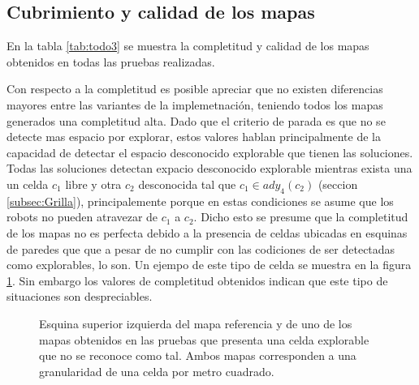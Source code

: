 \subsection{Cubrimiento y calidad de los mapas} \label{sec:exp:cubcal}



En la tabla \ref{tab:todo3} se muestra la completitud y calidad de los mapas
obtenidos en todas las pruebas realizadas. 

Con respecto a la completitud es posible apreciar que no existen diferencias
mayores entre las variantes de la implemetnación, teniendo todos los mapas
generados una completitud alta. Dado que el criterio de parada es que no se
detecte mas espacio por explorar, estos valores hablan principalmente de la
capacidad de detectar el espacio desconocido explorable que tienen las
soluciones. Todas las soluciones detectan expacio desconocido explorable
mientras exista una un celda $c_1$ libre y otra $c_2$ desconocida tal que $c_1
\in ady_4(c_2)$ (seccion \ref{subsec:Grilla}), principalemente porque en estas
condiciones se asume que los robots no pueden atravezar de $c_1$ a $c_2$. Dicho
esto se presume que la completitud de los mapas no es perfecta debido a la
presencia de celdas ubicadas en esquinas de paredes que que a pesar de no
cumplir con las codiciones de ser detectadas como explorables, lo son. Un
ejempo de este tipo de celda se muestra en la figura \ref{fig:faltaCub}. Sin
embargo los valores de completitud obtenidos indican que este tipo de
situaciones son despreciables.

\begin{figure}[H]
  \centerfloat

  \qquad

  \caption{Esquina superior izquierda del mapa referencia y de uno de los mapas
  obtenidos en las pruebas que presenta una celda explorable que no se reconoce
como tal. Ambos mapas corresponden a una granularidad de una celda por metro cuadrado.}\label{fig:faltaCub}

\end{figure}


